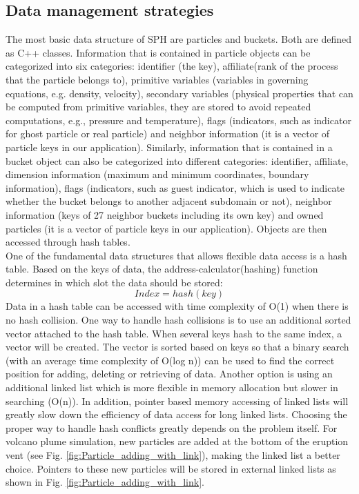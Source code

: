 \subsection{Data management strategies}
The most basic data structure of SPH are particles and buckets. Both are defined as C++ classes. Information that is contained in particle objects can be categorized into six categories: identifier (the key), affiliate(rank of the process that the particle belongs to), primitive variables (variables in governing equations, e.g. density, velocity), secondary variables (physical properties that can be computed from primitive variables, they are stored to avoid repeated computations, e.g., pressure and temperature), flags (indicators, such as indicator for ghost particle or real particle) and neighbor information (it is a vector of particle keys in our application). Similarly,  information that is contained in a bucket object can also be categorized into different categories: identifier, affiliate, dimension information (maximum and minimum coordinates, boundary information), flags (indicators, such as guest indicator, which is used  to indicate whether the bucket belongs to another adjacent subdomain or not), neighbor information (keys of 27 neighbor buckets including its own key) and owned particles (it is a vector of particle keys in our application). Objects are then accessed through hash tables.\\
One of the fundamental data structures that allows flexible data access is a hash table. Based on the keys of data, the address-calculator(hashing) function determines in which slot the data should be stored:
\begin{equation}
Index = hash(key)
\end{equation}
Data in a hash table can be accessed with time complexity of O(1) when there is no hash collision. One way to handle hash collisions is to use an additional sorted vector attached to the hash table. When several keys hash to the same index, a vector will be created. The vector is sorted based on keys so that a binary search (with an average time complexity of O(log n)) can be used to find the correct position for adding, deleting or retrieving of data. Another option is using an additional linked list which is more flexible in memory allocation but slower in searching (O(n)). In addition, pointer based memory accessing of linked lists will greatly slow down the efficiency of data access for long linked lists. Choosing the proper way to handle hash conflicts greatly depends on the problem itself. For volcano plume simulation, new particles are added at the bottom of the eruption vent (see Fig. \ref{fig:Particle_adding_with_link}), making the linked list a better choice. Pointers to these new particles will be stored in external linked lists as shown in Fig. \ref{fig:Particle_adding_with_link}.
